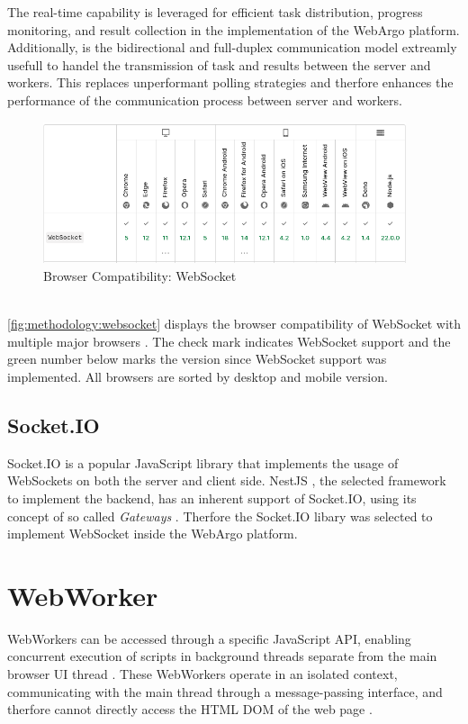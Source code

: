 The real-time capability is leveraged for efficient task distribution, progress monitoring, and result collection in the implementation of the WebArgo platform. Additionally, is the bidirectional and full-duplex communication model extreamly usefull to handel the transmission of task and results between the server and workers. This replaces unperformant polling strategies and therfore enhances the performance of the communication process between server and workers.
\begin{figure}[htbp]
  \centering
  \includegraphics[width=0.95\textwidth]{gfx/figures/websocket-browsercompability.png}
  \caption{Browser Compatibility: WebSocket \cite{methodology:websockets1}}
  \label{fig:methodology:websocket}
\end{figure}
~\\
\autoref{fig:methodology:websocket} displays the browser compatibility of WebSocket with multiple major browsers \cite{methodology:websockets1}. The check mark indicates WebSocket support and the green number below marks the version since WebSocket support was implemented. All browsers are sorted by desktop and mobile version. 

\subsection{Socket.IO}
Socket.IO \cite{methodology:websockets2} is a popular JavaScript library that implements the usage of WebSockets on both the server and client side. NestJS \cite{methodology:nestjs}, the selected framework to implement the backend, has an inherent support of Socket.IO, using its concept of so called \emph{Gateways} \cite{methodology:nestjs}. Therfore the Socket.IO libary was selected to implement WebSocket inside the WebArgo platform.

\section{WebWorker}
\label{sec:methodology:webworker}
WebWorkers can be accessed through a specific JavaScript \ac{API}, enabling concurrent execution of scripts in background threads separate from the main browser UI thread \cite{methodology:webworkers}. These WebWorkers operate in an isolated context, communicating with the main thread through a message-passing interface, and therfore cannot directly access the \acs{HTML} \acs{DOM} of the web page \cite{methodology:webworkers}. 

